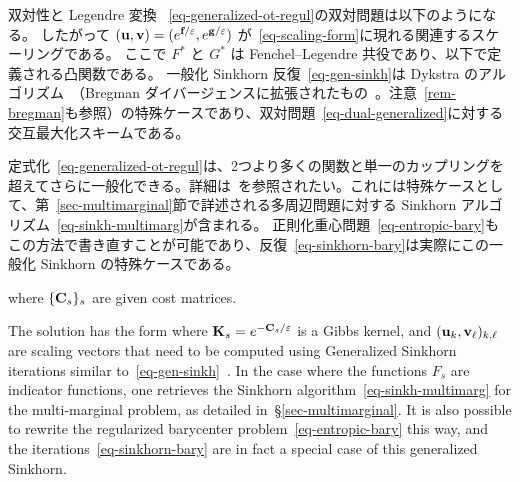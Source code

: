 \begin{rem1}{双対性と Legendre 変換}
~\eqref{eq-generalized-ot-regul}の双対問題は以下のようになる。
したがって $(\mathrm{\textbf{u}},\mathrm{\textbf{v}}) = (e^{\mathrm{\textbf{f}}/\varepsilon},e^{\mathrm{\textbf{g}}/\varepsilon})$ が~\eqref{eq-scaling-form}に現れる関連するスケーリングである。
ここで $F^*$ と $G^*$ は Fenchel--Legendre 共役であり、以下で定義される凸関数である。
一般化 Sinkhorn 反復~\eqref{eq-gen-sinkh}は Dykstra のアルゴリズム~\citep{Dykstra83,Dykstra85}（Bregman ダイバージェンスに拡張されたもの~\citep{bauschke-lewis,CensorReich-Dykstra}。注意~\ref{rem-bregman}も参照）の特殊ケースであり、双対問題~\eqref{eq-dual-generalized}に対する交互最大化スキームである。
\end{rem1}

定式化~\eqref{eq-generalized-ot-regul}は、2つより多くの関数と単一のカップリングを超えてさらに一般化できる。詳細は~\citep{2016-chizat-sinkhorn}を参照されたい。これには特殊ケースとして、第~\ref{sec-multimarginal}節で詳述される多周辺問題に対する Sinkhorn アルゴリズム~\eqref{eq-sinkh-multimarg}が含まれる。
正則化重心問題~\eqref{eq-entropic-bary}もこの方法で書き直すことが可能であり、反復~\eqref{eq-sinkhorn-bary}は実際にこの一般化 Sinkhorn の特殊ケースである。


where $\{\mathrm{\textbf{C}}_s\}_s$ are given cost matrices.

The solution has the form
where $\mathrm{\textbf{K}}_s=e^{-\mathrm{\textbf{C}}_s/\varepsilon}$ is a Gibbs kernel, and $(\mathrm{\textbf{u}}_k,\mathrm{\textbf{v}}_\ell)_{k,\ell}$ are scaling vectors that need to be computed using Generalized Sinkhorn iterations similar to~\eqref{eq-gen-sinkh}~\citep{2016-chizat-sinkhorn}.
%
In the case where the functions $F_s$ are indicator functions, one retrieves the Sinkhorn algorithm~\eqref{eq-sinkh-multimarg} for the multi-marginal problem, as detailed in~\S\ref{sec-multimarginal}.
%
It is also possible to rewrite the regularized barycenter problem~\eqref{eq-entropic-bary} this way, and the iterations~\eqref{eq-sinkhorn-bary} are in fact a special case of this generalized Sinkhorn.

\fi %
